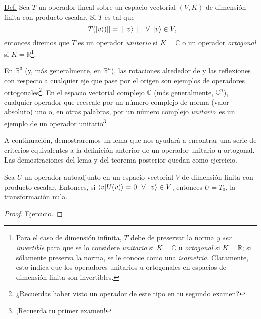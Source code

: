 \documentclass[12pt,dvipsnames]{article}
\newenvironment{lema}[2][Lema]{\begin{trivlist}
\item[\hskip \labelsep {\bfseries #1}\hskip \labelsep {\bfseries #2.}]}{\end{trivlist}}
\begin{document}
\begin{tcolorbox}
\underline{Def.} Sea $T$ un operador lineal sobre un espacio vectorial $(V,K)$ de dimensión finita con producto escalar. Si $T$ es tal que \[
    ||T(\ket{v})|| = ||\ket{v}|| \ \ \ \forall \ \ket{v}\in V,
\] entonces diremos que $T$ es un operador \emph{unitario} si $K=\mathbb{C}$ o un operador \emph{ortogonal} si $K=\mathbb{R}$\footnote{Para el caso de dimensión infinita, $T$ debe de preservar la norma \emph{y ser invertible} para que se lo considere \emph{unitario} si $K=\mathbb{C}$ u \emph{ortogonal} si $K=\mathbb{R}$; si sólamente preserva la norma, se le conoce como una \emph{isometría}. Claramente, esto indica que los operadores unitarios u ortogonales en espacios de dimensión finita son invertibles.}.
\end{tcolorbox}

En $\mathbb{R}^3$ (y, más generalmente, en $\mathbb{R}^n$), las rotaciones alrededor de y las reflexiones con respecto a cualquier eje que pase por el origen son ejemplos de operadores ortogonales\footnote{¿Recuerdas haber visto un operador de este tipo en tu segundo examen?}. En el espacio vectorial complejo $\mathbb{C}$ (más generalmente, $\mathbb{C}^n$), cualquier operador que reescale por un número complejo de norma (valor absoluto) uno \textemdash o, en otras palabras, por un número complejo \emph{unitario}\textemdash \ es un ejemplo de un operador unitario\footnote{¡Recuerda tu primer examen!}.

\vspace{3mm}
A continuación, demostraremos un lema que nos ayudará a encontrar una serie de criterios equivalentes a la definición anterior de un operador unitario u ortogonal. Las demostraciones del lema y del teorema posterior quedan como ejercicio.

\begin{lema} {16.1}
    Sea $U$ un operador autoadjunto en un espacio vectorial $V$ de dimensión finita con producto escalar. Entonces, si $\braket{v|U(v)}=0 \ \ \forall \ \ket{v}\in V$, entonces $U=T_0$, la transformación nula. 
\end{lema}

\begin{proof}
    Ejercicio.
\end{proof}
\end{document}

